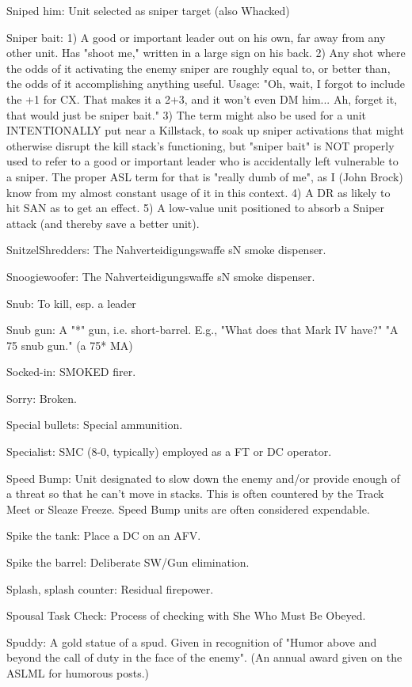 \documentclass[letterpaper]{article}
\begin{document}
Sniped him: Unit selected as sniper target (also Whacked)

Sniper bait: 1) A good or important leader out on his own, far away from any other unit.  Has "shoot me," written in a large sign on his back. 2) Any shot where the odds of it activating the enemy sniper are roughly equal to, or better than, the odds of it accomplishing anything useful.  Usage:  "Oh, wait, I forgot to include the +1 for CX.  That makes it a 2+3, and it won't even DM him... Ah, forget it, that would just be sniper bait." 3) The term might also be used for a unit INTENTIONALLY put near a Killstack, to soak up sniper activations that might otherwise disrupt the kill stack's functioning, but "sniper bait" is NOT properly used to refer to a good or important leader who is accidentally left vulnerable to a sniper.  The proper ASL term for that is "really dumb of me", as I (John Brock) know from my almost constant usage of it in this context. 4) A DR as likely to hit SAN as to get an effect. 5) A low-value unit positioned to absorb a Sniper attack (and thereby save a better unit).

SnitzelShredders: The Nahverteidigungswaffe sN smoke dispenser.

Snoogiewoofer: The Nahverteidigungswaffe sN smoke dispenser.

Snub: To kill, esp. a leader

Snub gun: A "*" gun, i.e. short-barrel. E.g., "What does that Mark IV have?" "A 75 snub gun." (a 75* MA)

Socked-in: SMOKED firer.

Sorry: Broken.

Special bullets: Special ammunition.

Specialist: SMC (8-0, typically) employed as a FT or DC operator.

Speed Bump: Unit designated to slow down the enemy and/or provide enough of a threat so that he can't move in stacks. This is often countered by the Track Meet or Sleaze Freeze. Speed Bump units are often considered expendable.

Spike the tank: Place a DC on an AFV.

Spike the barrel: Deliberate SW/Gun elimination.

Splash, splash counter: Residual firepower.

Spousal Task Check: Process of checking with She Who Must Be Obeyed.

Spuddy: A gold statue of a spud. Given in recognition of "Humor above and beyond the call of duty in the face of the enemy". (An annual award given on the ASLML for humorous posts.)
\end{document}

